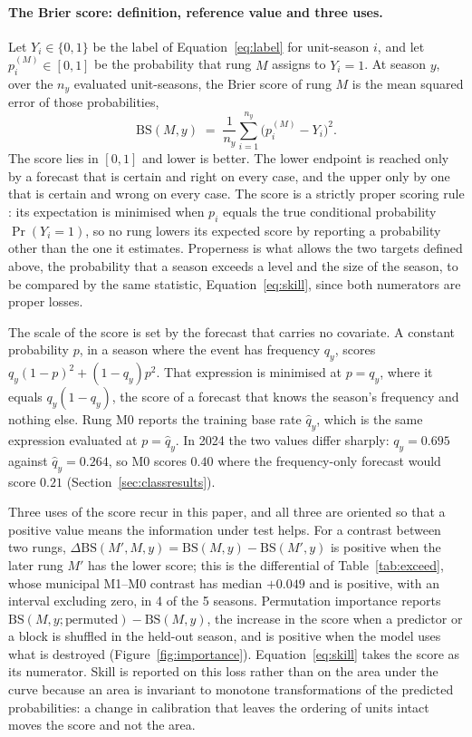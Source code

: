 \documentclass[english,10pt,b5paper]{article}
\begin{document}
\paragraph{The Brier score: definition, reference value and three uses.}

Let $Y_{i}\in\{0,1\}$ be the label of Equation~\eqref{eq:label} for unit-season
$i$, and let $p_{i}^{(M)}\in[0,1]$ be the probability that rung $M$ assigns to
$Y_{i}=1$. At season $y$, over the $n_{y}$ evaluated unit-seasons, the
Brier score of rung $M$ is the mean squared error of those probabilities,
%
\begin{equation}
\mathrm{BS}(M,y)\;=\;\frac{1}{n_{y}}\sum_{i=1}^{n_{y}}
\bigl(p_{i}^{(M)}-Y_{i}\bigr)^{2}.
\label{eq:brier}
\end{equation}
%
The score lies in $[0,1]$ and lower is better. The lower endpoint is reached only
by a forecast that is certain and right on every case, and the upper only by one
that is certain and wrong on every case. The score is a strictly proper scoring
rule \citep{gneiting2007strictly}: its expectation is minimised when $p_{i}$
equals the true conditional probability $\Pr(Y_{i}=1)$, so no rung lowers its
expected score by reporting a probability other than the one it estimates.
Properness is what allows the two targets defined above, the probability that a
season exceeds a level and the size of the season, to be compared by the same
statistic, Equation~\eqref{eq:skill}, since both numerators are proper losses.

The scale of the score is set by the forecast that carries no covariate. A
constant probability $p$, in a season where the event has frequency $q_{y}$,
scores $q_{y}(1-p)^{2}+(1-q_{y})p^{2}$. That expression is minimised at
$p=q_{y}$, where it equals $q_{y}(1-q_{y})$, the score of a forecast that knows
the season's frequency and nothing else. Rung M0 reports the training base rate
$\hat q_{y}$, which is the same expression evaluated at $p=\hat q_{y}$. In 2024
the two values differ sharply: $q_{y}=0.695$ against $\hat q_{y}=0.264$, so M0
scores $0.40$ where the frequency-only forecast would score $0.21$
(Section~\ref{sec:classresults}).

Three uses of the score recur in this paper, and all three are oriented so that a
positive value means the information under test helps. For a contrast between two
rungs, $\Delta\mathrm{BS}(M',M,y)=\mathrm{BS}(M,y)-\mathrm{BS}(M',y)$ is positive
when the later rung $M'$ has the lower score; this is the differential of
Table~\ref{tab:exceed}, whose municipal M1--M0 contrast has median $+0.049$ and
is positive, with an interval excluding zero, in 4 of the 5 seasons. Permutation
importance reports $\mathrm{BS}(M,y;\text{permuted})-\mathrm{BS}(M,y)$, the
increase in the score when a predictor or a block is shuffled in the held-out
season, and is positive when the model uses what is destroyed
(Figure~\ref{fig:importance}). Equation~\eqref{eq:skill} takes the score as its
numerator. Skill is reported on this loss rather than on the area under the curve
because an area is invariant to monotone transformations of the predicted
probabilities: a change in calibration that leaves the ordering of units intact
moves the score and not the area.
\end{document}
